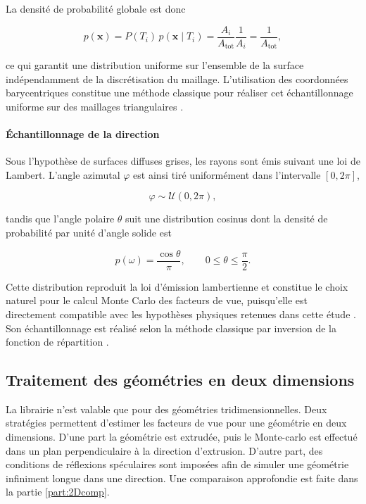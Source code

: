 La densité de probabilité globale est donc

\begin{equation}
p(\mathbf{x})
=
P(T_i)\,
p(\mathbf{x}\mid T_i)
=
\frac{A_i}{A_{\mathrm{tot}}}
\frac{1}{A_i}
=
\frac{1}{A_{\mathrm{tot}}},
\end{equation}

ce qui garantit une distribution uniforme sur l'ensemble de la surface indépendamment de la discrétisation du maillage. L'utilisation des coordonnées barycentriques constitue une méthode classique pour réaliser cet échantillonnage uniforme sur des maillages triangulaires \cite{Pharr2018}.

\paragraph{Échantillonnage de la direction}

Sous l'hypothèse de surfaces diffuses grises, les rayons sont émis suivant une loi de Lambert. L'angle azimutal $\varphi$ est ainsi tiré uniformément dans l'intervalle $[0,2\pi]$,

\begin{equation}
\varphi \sim \mathcal{U}(0,2\pi),
\end{equation}

tandis que l'angle polaire $\theta$ suit une distribution cosinus dont la densité de probabilité par unité d'angle solide est

\begin{equation}
p(\omega)=\frac{\cos\theta}{\pi},
\qquad
0 \leq \theta \leq \frac{\pi}{2}.
\end{equation}

Cette distribution reproduit la loi d'émission lambertienne et constitue le choix naturel pour le calcul Monte Carlo des facteurs de vue, puisqu'elle est directement compatible avec les hypothèses physiques retenues dans cette étude \cite{Howell}. Son échantillonnage est réalisé selon la méthode classique par inversion de la fonction de répartition \cite{Pharr2018}.





\subsection{Traitement des géométries en deux dimensions}
La librairie  n'est valable que pour des géométries tridimensionnelles. Deux stratégies permettent d'estimer les facteurs de vue pour une géométrie en deux dimensions. D'une part la géométrie est extrudée, puis le Monte-carlo est effectué dans un plan perpendiculaire à la direction d'extrusion. D'autre part, des conditions de réflexions spéculaires sont imposées afin de simuler une géométrie infiniment longue dans une direction. Une comparaison approfondie est faite dans la partie \ref{part:2Dcomp}.


